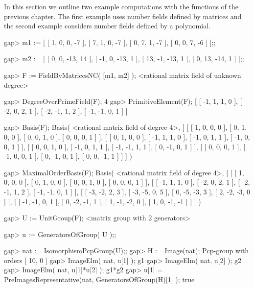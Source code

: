 

In this section we outline two example computations with the functions
of the previous chapter. The first example uses number fields defined 
by matrices and the second example considers number fields defined by
a polynomial.


\beginexample
gap> m1 := [ [ 1, 0, 0, -7 ], 
             [ 7, 1, 0, -7 ], 
             [ 0, 7, 1, -7 ],
             [ 0, 0, 7, -6 ] ];;

gap> m2 := [ [ 0, 0, -13, 14 ], 
             [ -1, 0, -13, 1 ], 
             [ 13, -1, -13, 1 ], 
             [ 0, 13, -14, 1 ] ];;

gap> F := FieldByMatricesNC( [m1, m2] );
<rational matrix field of unknown degree>

gap> DegreeOverPrimeField(F);
4
gap> PrimitiveElement(F);
[ [ -1, 1, 1, 0 ], [ -2, 0, 2, 1 ], [ -2, -1, 1, 2 ], [ -1, -1, 0, 1 ] ]

gap> Basis(F);
Basis( <rational matrix field of degree 4>, 
[ [ [ 1, 0, 0, 0 ], [ 0, 1, 0, 0 ], [ 0, 0, 1, 0 ], [ 0, 0, 0, 1 ] ], 
  [ [ 0, 1, 0, 0 ], [ -1, 1, 1, 0 ], [ -1, 0, 1, 1 ], [ -1, 0, 0, 1 ] ], 
  [ [ 0, 0, 1, 0 ], [ -1, 0, 1, 1 ], [ -1, -1, 1, 1 ], [ 0, -1, 0, 1 ] ], 
  [ [ 0, 0, 0, 1 ], [ -1, 0, 0, 1 ], [ 0, -1, 0, 1 ], [ 0, 0, -1, 1 ] ] ] )

gap> MaximalOrderBasis(F);
Basis( <rational matrix field of degree 4>, 
[ [ [ 1, 0, 0, 0 ], [ 0, 1, 0, 0 ], [ 0, 0, 1, 0 ], [ 0, 0, 0, 1 ] ],
  [ [ -1, 1, 1, 0 ], [ -2, 0, 2, 1 ], [ -2, -1, 1, 2 ], [ -1, -1, 0, 1 ] ],
  [ [ -3, -2, 2, 3 ], [ -3, -5, 0, 5 ], [ 0, -5, -3, 3 ], [ 2, -2, -3, 0 ] ],
  [ [ -1, -1, 0, 1 ], [ 0, -2, -1, 1 ], [ 1, -1, -2, 0 ], [ 1, 0, -1, -1 ] ]
 ] )

gap> U := UnitGroup(F);
<matrix group with 2 generators>

gap> u := GeneratorsOfGroup( U );;

gap> nat := IsomorphismPcpGroup(U);;
gap> H := Image(nat);
Pcp-group with orders [ 10, 0 ]
gap> ImageElm( nat, u[1] );
g1
gap> ImageElm( nat, u[2] );
g2
gap> ImageElm( nat, u[1]*u[2] );
g1*g2
gap> u[1] = PreImagesRepresentative(nat, GeneratorsOfGroup(H)[1] );
true
\endexample


